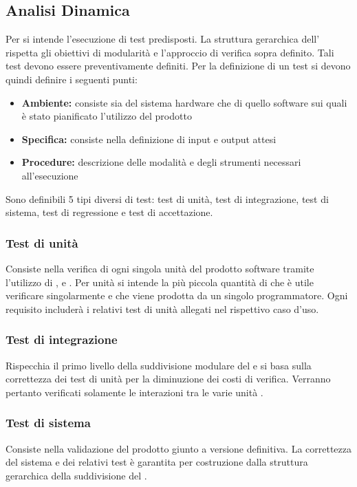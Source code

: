 \documentclass[12pt,a4paper]{article}
\begin{document}
\subsection{Analisi Dinamica} 
Per   si intende l'esecuzione di test predisposti. La struttura gerarchica dell'  rispetta gli obiettivi di modularità e l'approccio di verifica  sopra definito. Tali test devono essere preventivamente definiti. Per la definizione di un test si devono quindi definire i seguenti punti:

\begin{itemize}
	\item \textbf{Ambiente:} consiste sia del sistema hardware che di quello software sui quali è stato pianificato l'utilizzo del prodotto
	\item \textbf{Specifica:} consiste nella definizione di input e output attesi
	\item \textbf{Procedure:} descrizione delle modalità e degli strumenti necessari all'esecuzione
\end{itemize}

Sono definibili 5 tipi diversi di test: test di unità, test di integrazione, test di sistema, test di regressione e test di accettazione.

\subsubsection{Test di unità}
Consiste nella verifica di ogni singola unità del prodotto software tramite l'utilizzo di ,  e . Per unità si intende la più piccola quantità di  che è utile verificare singolarmente e che viene prodotta da un singolo programmatore. Ogni requisito includerà i relativi test di unità allegati nel rispettivo caso d'uso.

\subsubsection{Test di integrazione}
Rispecchia il primo livello della suddivisione modulare del  e si basa sulla correttezza dei test di unità per la diminuzione dei costi di verifica. Verranno pertanto verificati solamente le interazioni tra le varie unità .

\subsubsection{Test di sistema}
Consiste nella validazione del prodotto giunto a versione definitiva. La correttezza del sistema e dei relativi test è garantita per costruzione dalla struttura gerarchica della suddivisione del .
\end{document}
